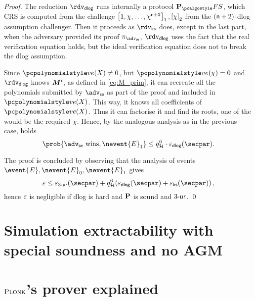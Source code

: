 \documentclass[runningheads,11pt]{llncs}
\let\spvec\vec
\let\vec\accentvec
\let\vec\spvec
\def\vec#1{\mathchoice{\mbox{\boldmath$\displaystyle#1$}}
	{\mbox{\boldmath$\textstyle#1$}}
	{\mbox{\boldmath$\scriptstyle#1$}}
	{\mbox{\boldmath$\scriptscriptstyle#1$}}}
\theoremstyle{definition}
\begin{document}
\begin{proof}
The reduction $\rdvdlog$ runs internally a protocol $\plonkprotfs$, which CRS is computed from the challenge $\left[1, \chi, \ldots, \chi^{\mathsf{n} + 2}\right]_{1}, \left[\chi\right]_{2}$ from the $(\mathsf{n} + 2)$-dlog assumption challenger. 
Then it proceeds as $\rdvks$ does, except in the last part, when the adversary provided its proof $\zkproof_\advse$, $\rdvdlog$ uses the fact that the real verification equation holds, but the ideal verification equation does not to break the dlog assumption. 


Since $\vereq(X) \neq 0$, but $\vereq(\chi) = 0$ and $\rdvdlog$ knows $\vec{M'}$, as defined in \cref{eq:M_prim}, it can recreate all the polynomials submitted by $\advse$ as part of the proof and included in $\vereq(X)$. This way, it knows all coefficients of $\vereq(X)$. Thus it can factorise it and find its roots, one of the would be the required $\chi$. Hence, by the analogous analysis as in the previous case, holds
\[
	\prob{\advse \text{ wins}, \nevent{E}_1} \leq q_\ro^6 \cdot \eps_{\dlog}(\secpar).
\]

The proof is concluded by observing that the analysis of events $\event{E}, \nevent{E}_0, \nevent{E}_1$ gives
\[
	\eps \leq \eps_{\ur{3}}(\secpar) + q_\ro^6 (\eps_{\dlog}(\secpar) + \eps_{\ks}(\secpar))\,,
\]
hence $\varepsilon$ is negligible if dlog is hard and $\mathbf{P}$ is sound and ${3\text{-}\mathsf{ur}}$.
\qed
\end{proof}

\section{Simulation extractability with special soundness and no AGM}



\appendix
\section{$\textsc{Plonk}$'s prover explained}
\label{sec:plonk_explained}

\paragraph{}
\end{document}
